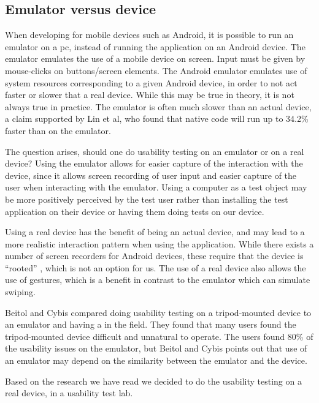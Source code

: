 \subsection{Emulator versus device}
When developing for mobile devices such as Android, it is possible to run an emulator on a pc, instead of running the application on an Android device. The emulator emulates the use of a mobile device on screen. Input must be given by mouse-clicks on buttons/screen elements. The Android emulator emulates use of system resources corresponding to a given Android device, in order to not act faster or slower that a real device. While this may be true in theory, it is not always true in practice. The emulator is often much slower than an actual device, a claim supported by Lin et al\cite{lin2011benchmark}, who found that native code will run up to 34.2\% faster than on the emulator.



The question arises, should one do usability testing on an emulator or on a real device?
Using the emulator allows for easier capture of the interaction with the device, since it allows screen recording of user input and easier capture of the user when interacting with the emulator. Using a computer as a test object may be more positively perceived by the test user rather than installing the test application on their device or having them doing tests on our device. 

Using a real device has the benefit of being an actual device, and may lead to a more realistic interaction pattern when using the application. While there exists a number of screen recorders for Android devices, these require that the device is ``rooted'' \cite{androidrooting}, which is not an option for us. 
The use of a real device also allows the use of gestures, which is a benefit in contrast to the emulator which can simulate swiping. 


Beitol and Cybis \cite{betiol2005usability} compared doing usability testing on a tripod-mounted device to an emulator and having a in the field. They found that many users found the tripod-mounted device difficult and unnatural to operate. The users found 80\% of the usability issues on the emulator, but Beitol and Cybis points out that use of an emulator may depend on the similarity between the emulator and the device. 

Based on the research we have read we decided to do the usability testing on a real device, in a usability test lab.
